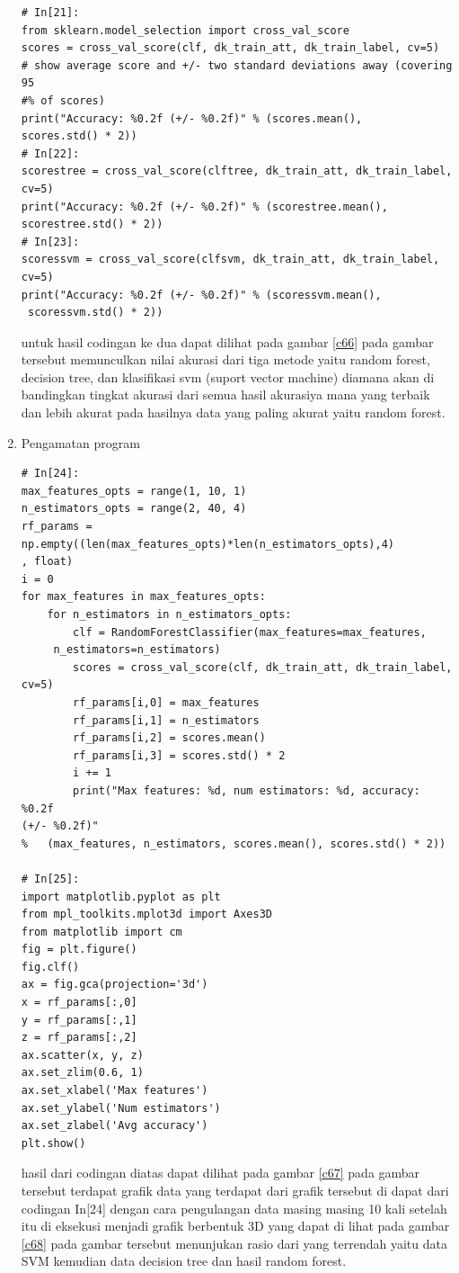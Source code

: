 \begin{enumerate}
\begin{verbatim}
# In[21]:
from sklearn.model_selection import cross_val_score
scores = cross_val_score(clf, dk_train_att, dk_train_label, cv=5)
# show average score and +/- two standard deviations away (covering 95
#% of scores)
print("Accuracy: %0.2f (+/- %0.2f)" % (scores.mean(), 
scores.std() * 2))
# In[22]:
scorestree = cross_val_score(clftree, dk_train_att, dk_train_label, cv=5)
print("Accuracy: %0.2f (+/- %0.2f)" % (scorestree.mean(), 
scorestree.std() * 2))
# In[23]:
scoressvm = cross_val_score(clfsvm, dk_train_att, dk_train_label, cv=5)
print("Accuracy: %0.2f (+/- %0.2f)" % (scoressvm.mean(),
 scoressvm.std() * 2))
\end{verbatim}
untuk hasil codingan ke dua dapat dilihat pada gambar \ref{c66} pada gambar tersebut memunculkan nilai akurasi dari tiga metode yaitu random forest, decision tree, dan klasifikasi svm (suport vector machine) diamana akan di bandingkan tingkat akurasi dari semua hasil akurasiya mana yang terbaik dan lebih akurat pada hasilnya data yang paling akurat yaitu random forest.

\item Pengamatan program 
\begin{verbatim}
# In[24]:
max_features_opts = range(1, 10, 1)
n_estimators_opts = range(2, 40, 4)
rf_params = np.empty((len(max_features_opts)*len(n_estimators_opts),4)
, float)
i = 0
for max_features in max_features_opts:
    for n_estimators in n_estimators_opts:
        clf = RandomForestClassifier(max_features=max_features,
	 n_estimators=n_estimators)
        scores = cross_val_score(clf, dk_train_att, dk_train_label, cv=5)
        rf_params[i,0] = max_features
        rf_params[i,1] = n_estimators
        rf_params[i,2] = scores.mean()
        rf_params[i,3] = scores.std() * 2
        i += 1
        print("Max features: %d, num estimators: %d, accuracy: %0.2f 
(+/- %0.2f)" 
%   (max_features, n_estimators, scores.mean(), scores.std() * 2))

# In[25]:
import matplotlib.pyplot as plt
from mpl_toolkits.mplot3d import Axes3D
from matplotlib import cm
fig = plt.figure()
fig.clf()
ax = fig.gca(projection='3d')
x = rf_params[:,0]
y = rf_params[:,1]
z = rf_params[:,2]
ax.scatter(x, y, z)
ax.set_zlim(0.6, 1)
ax.set_xlabel('Max features')
ax.set_ylabel('Num estimators')
ax.set_zlabel('Avg accuracy')
plt.show()
\end{verbatim}
hasil dari codingan diatas dapat dilihat pada gambar \ref{c67} pada gambar tersebut terdapat grafik data yang terdapat dari grafik tersebut di dapat dari codingan In[24] dengan cara pengulangan data masing masing 10 kali setelah itu di eksekusi menjadi grafik berbentuk 3D yang dapat di lihat pada gambar \ref{c68} pada gambar tersebut menunjukan rasio dari yang terrendah yaitu data SVM kemudian data decision tree dan hasil random forest.

\end{enumerate}

